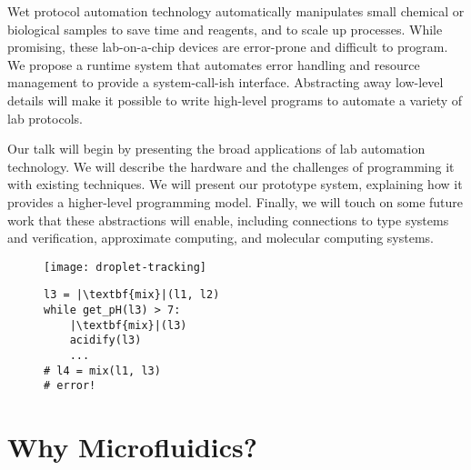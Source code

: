\documentclass[
  10pt,
  a4paper,
  twocolumn,
]{article}
\title{\mytitle}
\author{\myauthors
\\ \small Paul G. Allen School for Computer Science and Engineering
\\ \small University of Washington}
\date{}
\begin{document}
\maketitle

Wet protocol automation technology automatically manipulates small chemical or biological samples to save time and reagents, and to scale up processes.
While promising, these lab-on-a-chip devices are error-prone and difficult to program.
We propose a runtime system that automates error handling and resource management to provide a system-call-ish interface.
Abstracting away low-level details will make it possible to write high-level programs to automate a variety of lab protocols.

Our talk will begin by presenting the broad applications of lab automation technology.
We will describe the hardware and the challenges of programming it with existing techniques.
We will present our prototype system, explaining how it provides a higher-level programming model.
Finally, we will touch on some future work that these abstractions will enable, including connections to type systems and verification, approximate computing, and molecular computing systems.

\begin{figure}[h]
  \begin{minipage}{0.4\linewidth}
    \footnotesize
    \centering
    \texttt{[image: droplet-tracking]}
  \end{minipage}
  \hfill
  \begin{minipage}{0.53\linewidth}
    \begin{verbatim}
l3 = |\textbf{mix}|(l1, l2)
while get_pH(l3) > 7:
    |\textbf{mix}|(l3)
    acidify(l3)
    ...
# l4 = mix(l1, l3)
# error!
    \end{verbatim}
  \end{minipage}
  \label{fig:board}
  \vspace{-1em}
  \label{fig:code}
  \vspace{-2em}
\end{figure}

\section*{Why Microfluidics?}
\end{document}
